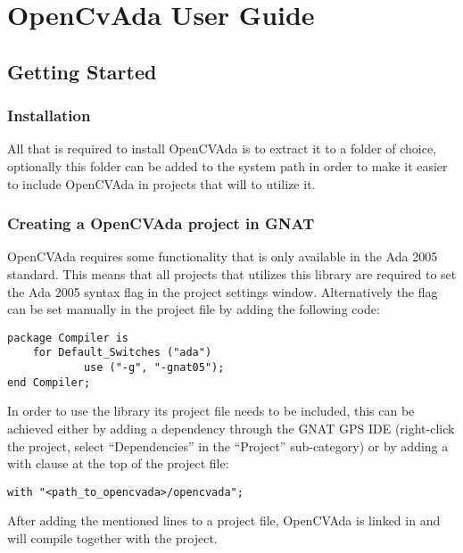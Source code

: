 \chapter{OpenCvAda User Guide}\label{sec:userguide}
\section{Getting Started}
\subsection{Installation}
All that is required to install OpenCVAda is to extract it to a folder of choice, optionally this folder can be added to the system path in order to make it easier to include OpenCVAda in projects that will to utilize it.
\subsection{Creating a OpenCVAda project in GNAT}
OpenCVAda requires some functionality that is only available in the Ada 2005 standard. This means that all projects that utilizes this library are required to set the Ada 2005 syntax flag in the project settings window. Alternatively the flag can be set manually in the project file by adding the following code:
\begin{lstlisting}
package Compiler is
	for Default_Switches ("ada") 
            use ("-g", "-gnat05");
end Compiler;
\end{lstlisting}
In order to use the library its project file needs to be included, this can be achieved either by adding a dependency through the GNAT GPS IDE (right-click the project, select ``Dependencies'' in the ``Project'' sub-category) or by adding a with clause at the top of the project file:
\begin{lstlisting}
with "<path_to_opencvada>/opencvada";
\end{lstlisting}
After adding the mentioned lines to a project file, OpenCVAda is linked in and will compile together with the project.
